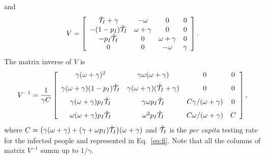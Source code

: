 \documentclass[12pt]{article}
\newcommand{\percap}{\emph{per capita}\xspace}
\newcommand{\testinghat}[1]{\ensuremath{\hat{\cal T}_{#1}}\xspace}
\DeclareRobustCommand\_{\ifmmode\expandafter\subtxt\else\textunderscore\fi}
\theoremstyle{definition} %
\begin{document}
and 
\begin{align}
\label{V}
V= \left[ \begin {array}{cccc}  
\testinghat{I}+\gamma&-\omega&0&0\\
-(1-p_I)\testinghat{I}&\omega+\gamma&0&0\\
-p_I \testinghat{I}&0&\omega+\gamma&0\\
0&0&-\omega&\gamma
\end {array} \right].
\end{align}
The matrix inverse of $V$ is 
\begin{align}
\label{vinv}
V^{-1} =
\frac{1}{\gamma C}
\left[ \begin {array}{cccc}
\gamma(\omega+\gamma)^2 & \gamma\omega(\omega+\gamma)&0&0\\ \noalign{\medskip}
\gamma(\omega+\gamma)(1-p_I) \testinghat{I} & \gamma(\omega+\gamma)(\testinghat{I}+\gamma)&0&0 \\ \noalign{\medskip}
\gamma(\omega+\gamma) p_I \testinghat{I} & \gamma\omega p_I \testinghat{I} & C \gamma/(\omega+\gamma) & 0 \\ \noalign{\medskip}
\omega(\omega+\gamma) p_I \testinghat{I} & \omega^2 p_I \testinghat{I} & C \omega/(\omega+\gamma) & C
\end {array} \right],
\end{align}
where $C= \big( \gamma(\omega+\gamma)+(\gamma+\omega p_I)\testinghat{I} \big) (\omega+\gamma)$ and $\testinghat{I}$ is the \percap testing rate for the infected people and represented in Eq.~\eqref{eq:fi}. Note that all the columns of matrix $V^{-1}$ summ up to $1/\gamma$.
\end{document}
